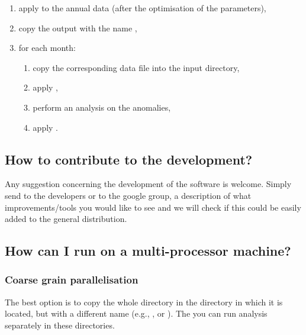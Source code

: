 \begin{enumerate} 
\item apply  to the annual data (after the optimisation of the parameters),
\item copy the output  with the name ,
\item for each month:
\begin{enumerate}
\item copy the corresponding data file into the input directory,
\item apply ,
\item perform an analysis on the anomalies,
\item apply .
\end{enumerate}									 
\end{enumerate}
									 
%
%

\subsection{How to contribute to the development?}

Any suggestion concerning the development of the software is welcome. Simply send to the developers or to the google group, a description  of what improvements/tools you would like to see and we will check if this could be easily added to the general distribution.


\subsection{How can I run \diva on a multi-processor machine?}

\subsubsection{Coarse grain parallelisation}

The best option is to copy the whole directory  in the directory in which it is located, but with a different name (e.g., , or ). The you can run \diva analysis separately in these directories. 


